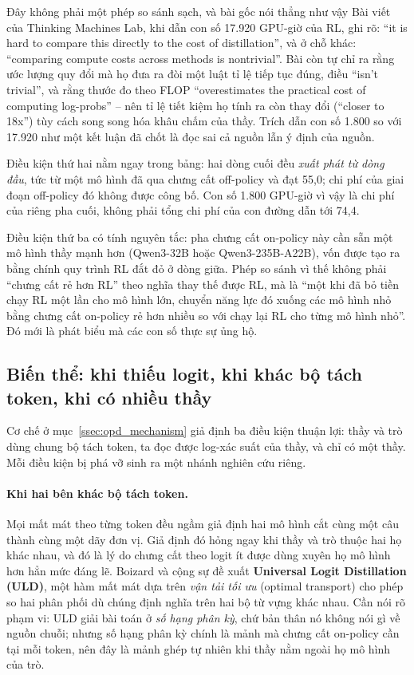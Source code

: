 \begin{pitfall}{Đây không phải một phép so sánh sạch, và bài gốc nói thẳng như vậy}
Bài viết của Thinking Machines Lab, khi dẫn con số 17.920 GPU-giờ của RL, ghi rõ: ``it is hard to compare this directly to the cost of distillation'', và ở chỗ khác: ``comparing compute costs across methods is nontrivial''. Bài còn tự chỉ ra rằng ước lượng quy đổi mà họ đưa ra đòi một luật tỉ lệ tiếp tục đúng, điều ``isn't trivial'', và rằng thước đo theo FLOP ``overestimates the practical cost of computing log-probs'' -- nên tỉ lệ tiết kiệm họ tính ra còn thay đổi (``closer to 18x'') tùy cách song song hóa khâu chấm của thầy. Trích dẫn con số 1.800 so với 17.920 như một kết luận đã chốt là đọc sai cả nguồn lẫn ý định của nguồn.
\end{pitfall}

Điều kiện thứ hai nằm ngay trong bảng: hai dòng cuối đều \emph{xuất phát từ dòng đầu}, tức từ một mô hình đã qua chưng cất off-policy và đạt 55,0; chi phí của giai đoạn off-policy đó không được công bố. Con số 1.800 GPU-giờ vì vậy là chi phí của riêng pha cuối, không phải tổng chi phí của con đường dẫn tới 74,4.

Điều kiện thứ ba có tính nguyên tắc: pha chưng cất on-policy này cần sẵn một mô hình thầy mạnh hơn (Qwen3-32B hoặc Qwen3-235B-A22B), vốn được tạo ra bằng chính quy trình RL đắt đỏ ở dòng giữa. Phép so sánh vì thế không phải ``chưng cất rẻ hơn RL'' theo nghĩa thay thế được RL, mà là ``một khi đã bỏ tiền chạy RL một lần cho mô hình lớn, chuyển năng lực đó xuống các mô hình nhỏ bằng chưng cất on-policy rẻ hơn nhiều so với chạy lại RL cho từng mô hình nhỏ''. Đó mới là phát biểu mà các con số thực sự ủng hộ.

\subsection{Biến thể: khi thiếu logit, khi khác bộ tách token, khi có nhiều thầy}
\label{ssec:opd_variants}

Cơ chế ở mục~\ref{ssec:opd_mechanism} giả định ba điều kiện thuận lợi: thầy và trò dùng chung bộ tách token, ta đọc được log-xác suất của thầy, và chỉ có một thầy. Mỗi điều kiện bị phá vỡ sinh ra một nhánh nghiên cứu riêng.

\paragraph{Khi hai bên khác bộ tách token.} Mọi mất mát theo từng token đều ngầm giả định hai mô hình cắt cùng một câu thành cùng một dãy đơn vị. Giả định đó hỏng ngay khi thầy và trò thuộc hai họ khác nhau, và đó là lý do chưng cất theo logit ít được dùng xuyên họ mô hình hơn hẳn mức đáng lẽ. Boizard và cộng sự \cite{boizard2025uld} đề xuất \textbf{Universal Logit Distillation (ULD)}, một hàm mất mát dựa trên \emph{vận tải tối ưu} (optimal transport) cho phép so hai phân phối dù chúng định nghĩa trên hai bộ từ vựng khác nhau. Cần nói rõ phạm vi: ULD giải bài toán ở \emph{số hạng phân kỳ}, chứ bản thân nó không nói gì về nguồn chuỗi; nhưng số hạng phân kỳ chính là mảnh mà chưng cất on-policy cần tại mỗi token, nên đây là mảnh ghép tự nhiên khi thầy nằm ngoài họ mô hình của trò.

